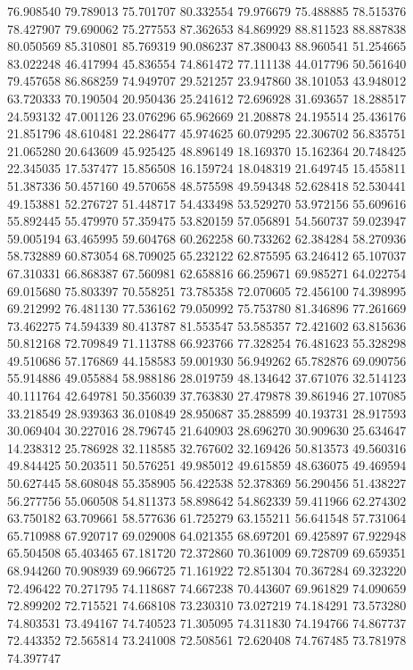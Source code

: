 76.908540
79.789013
75.701707
80.332554
79.976679
75.488885
78.515376
78.427907
79.690062
75.277553
87.362653
84.869929
88.811523
88.887838
80.050569
85.310801
85.769319
90.086237
87.380043
88.960541
51.254665
83.022248
46.417994
45.836554
74.861472
77.111138
44.017796
50.561640
79.457658
86.868259
74.949707
29.521257
23.947860
38.101053
43.948012
63.720333
70.190504
20.950436
25.241612
72.696928
31.693657
18.288517
24.593132
47.001126
23.076296
65.962669
21.208878
24.195514
25.436176
21.851796
48.610481
22.286477
45.974625
60.079295
22.306702
56.835751
21.065280
20.643609
45.925425
48.896149
18.169370
15.162364
20.748425
22.345035
17.537477
15.856508
16.159724
18.048319
21.649745
15.455811
51.387336
50.457160
49.570658
48.575598
49.594348
52.628418
52.530441
49.153881
52.276727
51.448717
54.433498
53.529270
53.972156
55.609616
55.892445
55.479970
57.359475
53.820159
57.056891
54.560737
59.023947
59.005194
63.465995
59.604768
60.262258
60.733262
62.384284
58.270936
58.732889
60.873054
68.709025
65.232122
62.875595
63.246412
65.107037
67.310331
66.868387
67.560981
62.658816
66.259671
69.985271
64.022754
69.015680
75.803397
70.558251
73.785358
72.070605
72.456100
74.398995
69.212992
76.481130
77.536162
79.050992
75.753780
81.346896
77.261669
73.462275
74.594339
80.413787
81.553547
53.585357
72.421602
63.815636
50.812168
72.709849
71.113788
66.923766
77.328254
76.481623
55.328298
49.510686
57.176869
44.158583
59.001930
56.949262
65.782876
69.090756
55.914886
49.055884
58.988186
28.019759
48.134642
37.671076
32.514123
40.111764
42.649781
50.356039
37.763830
27.479878
39.861946
27.107085
33.218549
28.939363
36.010849
28.950687
35.288599
40.193731
28.917593
30.069404
30.227016
28.796745
21.640903
28.696270
30.909630
25.634647
14.238312
25.786928
32.118585
32.767602
32.169426
50.813573
49.560316
49.844425
50.203511
50.576251
49.985012
49.615859
48.636075
49.469594
50.627445
58.608048
55.358905
56.422538
52.378369
56.290456
51.438227
56.277756
55.060508
54.811373
58.898642
54.862339
59.411966
62.274302
63.750182
63.709661
58.577636
61.725279
63.155211
56.641548
57.731064
65.710988
67.920717
69.029008
64.021355
68.697201
69.425897
67.922948
65.504508
65.403465
67.181720
72.372860
70.361009
69.728709
69.659351
68.944260
70.908939
69.966725
71.161922
72.851304
70.367284
69.323220
72.496422
70.271795
74.118687
74.667238
70.443607
69.961829
74.090659
72.899202
72.715521
74.668108
73.230310
73.027219
74.184291
73.573280
74.803531
73.494167
74.740523
71.305095
74.311830
74.194766
74.867737
72.443352
72.565814
73.241008
72.508561
72.620408
74.767485
73.781978
74.397747
